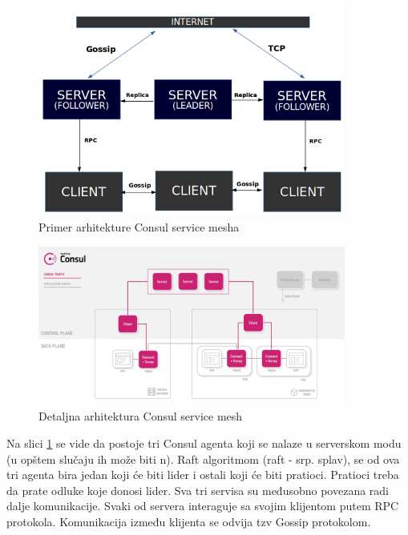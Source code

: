 \documentclass[a4paper,12pt]{report}
\begin{document}
\begin{figure}[h]
    \centering
    \includegraphics[width=0.9\textwidth]{consul_architecture.jpg}
    \caption{Primer arhitekture Consul service mesha}
    \label{fig:consul-architecture}
\end{figure} 

\begin{figure}[h]
    \centering
    \includegraphics[width=0.9\textwidth]{consul_architecture}
    \caption{Detaljna arhitektura Consul service mesh}
    \label{fig:detailed-consul-architecture}
\end{figure} 

Na slici \ref{fig:consul-architecture} se vide da postoje tri Consul agenta koji se nalaze u serverskom modu (u opštem slučaju ih može biti n). Raft algoritmom (raft - srp. splav), se od ova tri agenta bira jedan koji će biti lider i ostali koji će biti pratioci. Pratioci treba da prate odluke koje donosi lider. Sva tri servisa su međusobno povezana radi dalje komunikacije. Svaki od servera interaguje sa svojim klijentom putem RPC protokola. Komunikacija između klijenta se odvija tzv Gossip protokolom. \newline
\end{document}
